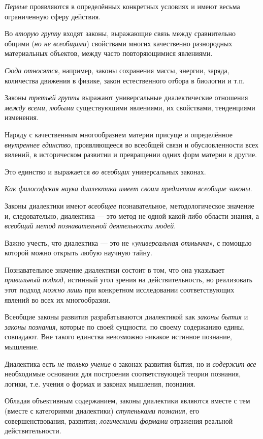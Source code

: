 \documentclass[a4paper,14pt,russian]{extreport}
\begin{document}
\emph{Первые} проявляются в определённых конкретных условиях и имеют весьма ограниченную сферу действия.

Во \emph{вторую группу} входят законы, выражающие связь между сравнительно общими (\emph{но не всеобщими}) свойствами многих качественно разнородных материальных объектов, между часто повторяющимися явлениями.

\emph{Сюда относятся}, например, законы сохранения массы, энергии, заряда, количества движения в физике, закон естественного отбора в биологии и т.п.

Законы \emph{третьей группы} выражают универсальные диалектические отношения \emph{между всеми}, \emph{любыми} существующими явлениями, их свойствами, тенденциями изменения.

Наряду с качественным многообразием материи присуще и определённое \emph{внутреннее единство}, проявляющееся во всеобщей связи и обусловленности всех явлений, в историческом развитии и превращении одних форм материи в другие.

Это единство и выражается \emph{во всеобщих} универсальных законах.

\emph{Как философская наука диалектика имеет своим предметом всеобщие законы}.

Законы диалектики имеют \emph{всеобщее} познавательное, методологическое значение и, следовательно, диалектика --- это метод не одной какой-либо области знания, а \emph{всеобщий метод познавательной деятельности людей}.

Важно учесть, что диалектика --- это не «\emph{универсальная отмычка}», с помощью которой можно открыть любую научную тайну.

Познавательное значение диалектики состоит в том, что она указывает \emph{правильный подход}, истинный угол зрения на действительность, но реализовать этот подход \emph{можно лишь} при конкретном исследовании соответствующих явлений во всех их многообразии.

Всеобщие законы развития разрабатываются диалектикой как \emph{законы бытия} и \emph{законы познания}, которые по своей сущности, по своему содержанию едины, совпадают. Вне такого единства невозможно никакое истинное познание, мышление.

Диалектика есть \emph{не только учение} о законах развития бытия, но и \emph{содержит все} необходимые основания для построения соответствующей теории познания, логики, т.е. учения о формах и законах мышления, познания.

Обладая объективным содержанием, законы диалектики являются вместе с тем (вместе с категориями диалектики) \emph{ступеньками познания}, его совершенствования, развития; \emph{логическими формами} отражения реальной действительности.
\end{document}
